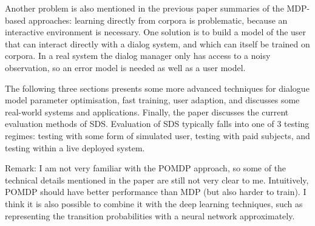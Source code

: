Another problem is also mentioned in the previous paper summaries of the MDP-based approaches: learning directly from corpora is problematic, because an interactive environment is necessary. One solution is to build a model of the user that can interact directly with a dialog system, and which can itself be trained on corpora. In a real system the dialog manager only has access to a noisy observation, so an error model is needed as well as a user model.

The following three sections presents some more advanced techniques for dialogue model parameter optimisation, fast training, user adaption, and discusses some real-world systems and applications. Finally, the paper discusses the current evaluation methods of SDS. Evaluation of SDS typically falls into one of 3 testing regimes: testing with some form of simulated user, testing with paid subjects, and testing within a live deployed system.

Remark: I am not very familiar with the POMDP approach, so some of the technical details mentioned in the paper are still not very clear to me. Intuitively, POMDP should have better performance than MDP (but also harder to train). I think it is also possible to combine it with the deep learning techniques, such as representing the transition probabilities with a neural network approximately. 